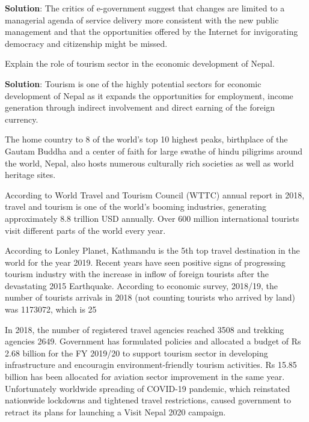 \documentclass[
]{book}
\newcommand{\question}{\item}
\newenvironment{solution}{ {\bfseries Solution}:}{}
\begin{document}
\begin{questions}
\begin{solution}
The critics of e-government suggest that changes are limited to a managerial agenda of service delivery more consistent with the new public management and that the opportunities offered by the Internet for invigorating democracy and citizenship might be missed.

\end{solution}

\question Explain the role of tourism sector in the economic development of Nepal.

\begin{solution}
Tourism is one of the highly potential sectors for economic development of Nepal as it expands the opportunities for employment, income generation through indirect involvement and direct earning of the foreign currency.

The home country to 8 of the world's top 10 highest peaks, birthplace of the Gautam Buddha and a center of faith for large swathe of hindu piligrims around the world, Nepal, also hosts numerous culturally rich societies as well as world heritage sites.

According to World Travel and Tourism Council (WTTC) annual report in 2018, travel and tourism is one of the world's booming industries, generating approximately 8.8 trillion USD annually. Over 600 million international tourists visit different parts of the world every year.

According to Lonley Planet, Kathmandu is the 5th top travel destination in the world for the year 2019. Recent years have seen positive signs of progressing tourism industry with the increase in inflow of foreign tourists after the devastating 2015 Earthquake. According to economic survey, 2018/19, the number of tourists arrivals in 2018 (not counting tourists who arrived by land) was 1173072, which is 25%

In 2018, the number of registered travel agencies reached 3508 and trekking agencies 2649. Government has formulated policies and allocated a budget of Rs 2.68 billion for the FY 2019/20 to support tourism sector in developing infrastructure and encouragin environment-friendly tourism activities. Rs 15.85 billion has been allocated for aviation sector improvement in the same year. Unfortunately worldwide spreading of COVID-19 pandemic, which reinstated nationwide lockdowns and tightened travel restrictions, caused government to retract its plans for launching a Visit Nepal 2020 campaign.


\end{solution}
\end{questions}
\end{document}
